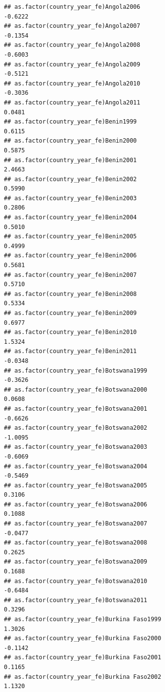 \documentclass[
  a4paper,
]{article}
\begin{document}
\begin{verbatim}
## as.factor(country_year_fe)Angola2006                           -0.6222
## as.factor(country_year_fe)Angola2007                           -0.1354
## as.factor(country_year_fe)Angola2008                           -0.6003
## as.factor(country_year_fe)Angola2009                           -0.5121
## as.factor(country_year_fe)Angola2010                           -0.3036
## as.factor(country_year_fe)Angola2011                            0.0481
## as.factor(country_year_fe)Benin1999                             0.6115
## as.factor(country_year_fe)Benin2000                             0.5875
## as.factor(country_year_fe)Benin2001                             2.4663
## as.factor(country_year_fe)Benin2002                             0.5990
## as.factor(country_year_fe)Benin2003                             0.2806
## as.factor(country_year_fe)Benin2004                             0.5010
## as.factor(country_year_fe)Benin2005                             0.4999
## as.factor(country_year_fe)Benin2006                             0.5681
## as.factor(country_year_fe)Benin2007                             0.5710
## as.factor(country_year_fe)Benin2008                             0.5334
## as.factor(country_year_fe)Benin2009                             0.6977
## as.factor(country_year_fe)Benin2010                             1.5324
## as.factor(country_year_fe)Benin2011                            -0.0348
## as.factor(country_year_fe)Botswana1999                         -0.3626
## as.factor(country_year_fe)Botswana2000                          0.0608
## as.factor(country_year_fe)Botswana2001                         -0.6626
## as.factor(country_year_fe)Botswana2002                         -1.0095
## as.factor(country_year_fe)Botswana2003                         -0.6069
## as.factor(country_year_fe)Botswana2004                         -0.5469
## as.factor(country_year_fe)Botswana2005                          0.3106
## as.factor(country_year_fe)Botswana2006                          0.1088
## as.factor(country_year_fe)Botswana2007                         -0.0477
## as.factor(country_year_fe)Botswana2008                          0.2625
## as.factor(country_year_fe)Botswana2009                          0.1688
## as.factor(country_year_fe)Botswana2010                         -0.6484
## as.factor(country_year_fe)Botswana2011                          0.3296
## as.factor(country_year_fe)Burkina Faso1999                      1.3026
## as.factor(country_year_fe)Burkina Faso2000                     -0.1142
## as.factor(country_year_fe)Burkina Faso2001                      0.1165
## as.factor(country_year_fe)Burkina Faso2002                      1.1320

\end{verbatim}
\end{document}
